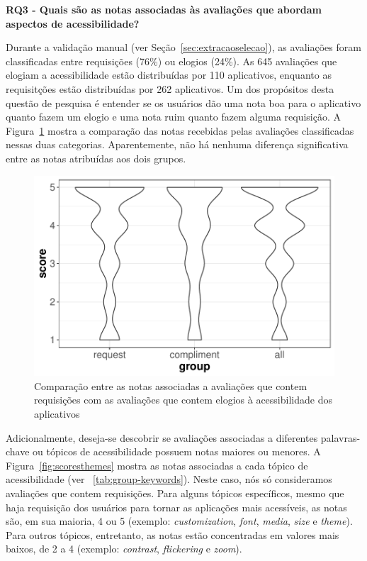 \textbf{RQ3 - Quais são as notas associadas às avaliações que abordam aspectos de acessibilidade?}


Durante a validação manual (ver Seção~\ref{sec:extracaoselecao}), as avaliações foram classificadas entre requisições (76\%) ou elogios (24\%).
As 645 avaliações que elogiam a acessibilidade estão distribuídas por 110 aplicativos, enquanto as requisitções estão distribuídas por 262 aplicativos. 
Um dos propósitos desta questão de pesquisa é entender se os usuários dão uma nota boa para o aplicativo quanto fazem um elogio e uma nota ruim quanto fazem alguma requisição. 
A Figura~\ref{fig:reqcompscores} mostra a comparação das notas recebidas pelas avaliações classificadas nessas duas categorias. Aparentemente, não há nenhuma diferença significativa entre as notas atribuídas aos dois grupos.

 \begin{figure}[!htb]
 \centering
\includegraphics[scale=0.8]{imagens/scores-compliment-request.pdf}
\caption{Comparação entre as notas associadas a avaliações que contem requisições com as avaliações que contem elogios à acessibilidade dos aplicativos}
\label{fig:reqcompscores}
\end{figure}

Adicionalmente, deseja-se descobrir se avaliações associadas a diferentes palavras-chave ou tópicos de acessibilidade possuem notas maiores ou menores. 
A Figura~\ref{fig:scoresthemes} mostra as notas associadas a cada tópico de acessibilidade (ver~ \ref{tab:group-keywords}). 
Neste caso, nós só consideramos avaliações que contem requisições. 
Para alguns tópicos específicos, mesmo que haja requisição dos usuários para tornar as aplicações mais acessíveis, as notas são, em sua maioria, 4 ou 5 (exemplo: \textit{customization}, \textit{font}, \textit{media}, \textit{size} e \textit{theme}).
Para outros tópicos, entretanto, as notas estão concentradas em valores mais baixos, de 2 a 4 (exemplo: \textit{contrast}, \textit{flickering} e \textit{zoom}). 


